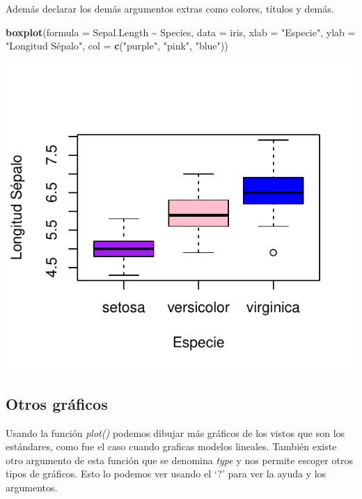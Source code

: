 \documentclass[
]{book}
\newenvironment{Shaded}{\begin{snugshade}}{\end{snugshade}}
\newcommand{\AttributeTok}[1]{\textcolor[rgb]{0.13,0.29,0.53}{#1}}
\newcommand{\FunctionTok}[1]{\textcolor[rgb]{0.13,0.29,0.53}{\textbf{#1}}}
\newcommand{\NormalTok}[1]{#1}
\newcommand{\SpecialCharTok}[1]{\textcolor[rgb]{0.81,0.36,0.00}{\textbf{#1}}}
\newcommand{\StringTok}[1]{\textcolor[rgb]{0.31,0.60,0.02}{#1}}
\begin{document}
Además declarar los demás argumentos extras como colores, títulos y demás.\\

\begin{Shaded}
\begin{Highlighting}[]
\FunctionTok{boxplot}\NormalTok{(}\AttributeTok{formula =}\NormalTok{ Sepal.Length }\SpecialCharTok{\textasciitilde{}}\NormalTok{ Species, }\AttributeTok{data =}\NormalTok{  iris, }\AttributeTok{xlab =} \StringTok{"Especie"}\NormalTok{, }
        \AttributeTok{ylab =} \StringTok{"Longitud Sépalo"}\NormalTok{, }\AttributeTok{col =} \FunctionTok{c}\NormalTok{(}\StringTok{"purple"}\NormalTok{, }\StringTok{"pink"}\NormalTok{, }\StringTok{"blue"}\NormalTok{))}
\end{Highlighting}
\end{Shaded}

\begin{center}\includegraphics{_main_files/figure-latex/unnamed-chunk-195-1} \end{center}

\subsection{Otros gráficos}\label{otros-gruxe1ficos}

Usando la función \emph{plot()} podemos dibujar más gráficos de los vistos que son los estándares, como fue el caso cuando graficas modelos lineales.
También existe otro argumento de esta función que se denomina \emph{type} y nos permite escoger otros tipos de gráficos.
Esto lo podemos ver usando el `?'
para ver la ayuda y los argumentos.\\
\end{document}
